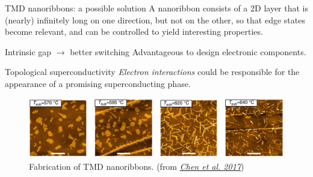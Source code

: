 \documentclass{beamer}
\begin{document}
  \begin{frame}{TMD nanoribbons: a possible solution}
  A nanoribbon consists of a 2D layer that is (nearly) infinitely long on one direction, but not on the other, so that edge states become relevant, and can be controlled to yield interesting properties.
  \begin{block}{Intrinsic gap $\rightarrow$ better switching}
        Advantageous to design electronic components.
      \end{block}

      \begin{block}{Topological superconductivity}
        \textit{Electron interactions} could be responsible for the appearance of a promising superconducting phase.
      \end{block}
      
      \begin{figure}
  \centering
  \includegraphics[scale = 0.2]{nanoribbons}
  \caption{Fabrication of TMD nanoribbons. (from 
    \href{https://www.nature.com/articles/ncomms15135}{\emph{Chen et al. 2017}})}
   \end{figure}
      
  \end{frame}    
  
\end{document}
